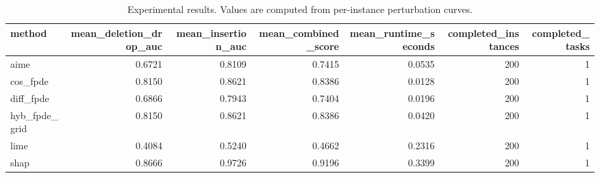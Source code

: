 \begin{table}[t]
\caption{Experimental results. Values are computed from per-instance perturbation curves.}
\label{tab:main_results_computed}
\centering
\begin{tabular}{lrrrrrr}
\toprule
method & mean\_deletion\_drop\_auc & mean\_insertion\_auc & mean\_combined\_score & mean\_runtime\_seconds & completed\_instances & completed\_tasks \\
\midrule
aime & 0.6721 & 0.8109 & 0.7415 & 0.0535 & 200 & 1 \\
cos\_fpde & 0.8150 & 0.8621 & 0.8386 & 0.0128 & 200 & 1 \\
diff\_fpde & 0.6866 & 0.7943 & 0.7404 & 0.0196 & 200 & 1 \\
hyb\_fpde\_grid & 0.8150 & 0.8621 & 0.8386 & 0.0420 & 200 & 1 \\
lime & 0.4084 & 0.5240 & 0.4662 & 0.2316 & 200 & 1 \\
shap & 0.8666 & 0.9726 & 0.9196 & 0.3399 & 200 & 1 \\
\bottomrule
\end{tabular}

\end{table}

